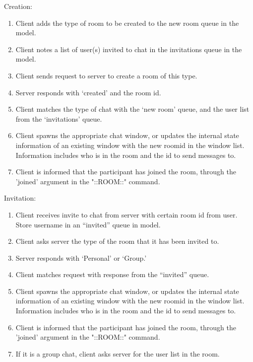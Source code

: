 Creation:
\begin{enumerate}
\item Client adds the type of room to be created to the new room queue in the model.
\item Client notes a list of user(s) invited to chat in the invitations queue in the model.
\item Client sends request to server to create a room of this type.
\item Server responds with `created' and the room id.
\item Client matches the type of chat with the `new room' queue, and the user list from the `invitations' queue.
\item Client spawns the appropriate chat window, or updates the internal state information of an existing window with the new roomid in the window list. Information includes who is in the room and the id to send messages to.
\item Client is informed that the participant has joined the room, through the 'joined' argument in the "::ROOM::" command.
\end {enumerate}

Invitation:
\begin{enumerate}
\item Client receives invite to chat from server with certain room id from user. Store username in an ``invited'' queue in model.  
\item Client asks server the type of the room that it has been invited to.
\item Server responds with `Personal' or `Group.'
\item Client matches request with response from the ``invited'' queue.
\item Client spawns the appropriate chat window, or updates the internal state information of an existing window with the new roomid in the window list. Information includes who is in the room and the id to send messages to.
\item Client is informed that the participant has joined the room, through the 'joined' argument in the "::ROOM::" command.
\item If it is a group chat, client asks server for the user list in the room.
\end{enumerate}

